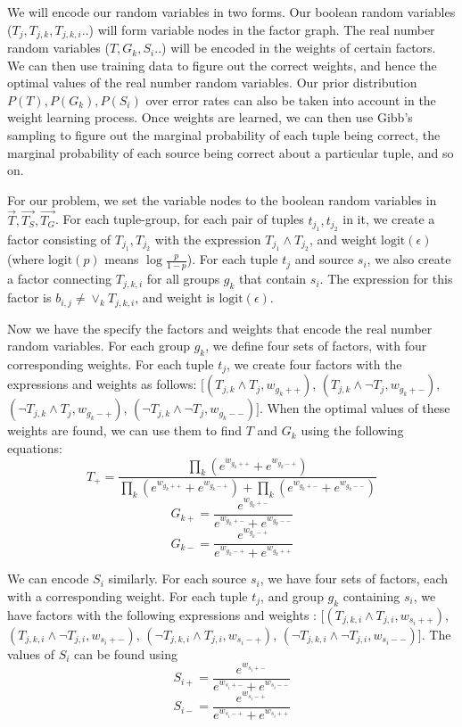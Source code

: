 \documentclass{sig-alternate}
\newcounter{prob}
\newcommand{\logit}{\mathrm{logit}}
\begin{document}
We will encode our random variables in two forms. Our boolean random variables ($T_j, T_{j,k}, T_{j,k,i}..$) will form variable nodes in the factor graph. The real number random variables ($T, G_k, S_i..$) will be encoded in the weights of certain factors. We can then use training data to figure out the correct weights, and hence the optimal values of the real number random variables. Our prior distribution $P(T), P(G_k), P(S_i)$ over error rates can also be taken into account in the weight learning process. Once weights are learned, we can then use Gibb's sampling to figure out the marginal probability of each tuple being correct, the marginal probability of each source being correct about a particular tuple, and so on. 

For our problem, we set the variable nodes to the boolean random variables in $\overrightarrow{T}, \overrightarrow{T_S}, \overrightarrow{T_G}$. For each tuple-group, for each pair of tuples $t_{j_1}, t_{j_2}$ in it, we create a factor consisting of $T_{j_1}, T_{j_2}$ with the expression $T_{j_1} \land T_{j_2}$, and weight $\logit(\epsilon)$ (where $\logit(p)$ means $\log\frac{p}{1-p}$). For each tuple $t_j$ and source $s_i$, we also create a factor connecting $T_{j,k,i}$ for all groups $g_k$ that contain $s_i$. The expression for this factor is $b_{i,j} \neq \lor_{k} T_{j,k,i}$, and weight is $\logit(\epsilon)$. 


Now we have the specify the factors and weights that encode the real number random variables. For each group $g_k$, we define four sets of factors, with four corresponding weights. For each tuple $t_j$, we create four factors with the expressions and weights as follows: $[(T_{j,k} \land T_j, w_{g_k++})$, $(T_{j,k} \land \lnot T_j, w_{g_k+-})$, $(\lnot T_{j,k} \land T_j, w_{g_k-+})$, $(\lnot T_{j,k} \land \lnot T_j, w_{g_k--})]$. When the optimal values of these weights are found, we can use them to find $T$ and $G_k$ using the following equations:
$$T_{+} = \frac{\prod_{k} (e^{w_{g_k++}} + e^{w_{g_k-+}})}{\prod_{k} (e^{w_{g_k++}} + e^{w_{g_k-+}}) + \prod_{k} (e^{w_{g_k+-}} + e^{w_{g_k--}})}$$
$$G_{k+} = \frac{e^{w_{g_k+-}}}{e^{w_{g_k+-}} + e^{w_{g_k--}}}$$
$$G_{k-} = \frac{e^{w_{g_k-+}}}{e^{w_{g_k-+}} + e^{w_{g_k++}}}$$

We can encode $S_i$ similarly. For each source $s_i$, we have four sets of factors, each with a corresponding weight. For each tuple $t_j$, and group $g_k$ containing $s_i$, we have factors with the following expressions and weights : $[(T_{j,k,i} \land T_{j,i}, w_{s_i++})$, $(T_{j,k,i} \land \lnot T_{j,i}, w_{s_i+-})$, $(\lnot T_{j,k,i} \land T_{j,i}, w_{s_i-+})$, $(\lnot T_{j,k,i} \land \lnot T_{j,i}, w_{s_i--})]$. The values of $S_i$ can be found using 
$$S_{i+} = \frac{e^{w_{s_i+-}}}{e^{w_{s_i+-}} + e^{w_{s_i--}}}$$
$$S_{i-} = \frac{e^{w_{s_i-+}}}{e^{w_{s_i-+}} + e^{w_{s_i++}}}$$
\end{document}
